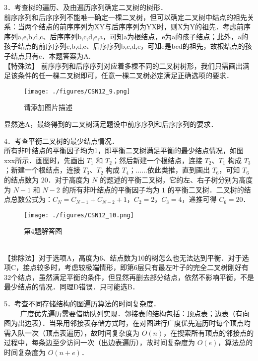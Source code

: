 3．考查树的遍历、及由遍历序列确定二叉树的树形．\\
前序序列和后序序列不能唯一确定一棵二叉树，但可以确定二叉树中结点的祖先关系：当两个结点的前序序列为XY与后序序列为YX时，则X为Y的祖先．考虑前序序列a,e,b,d,c、后序序列b,c,d,e,a，可知a为根结点，e为a的孩子结点；此外，a的孩子结点的前序序列e,b,d,c、后序序列b,c,d,e，可知e是bcd的祖先，故根结点的孩子结点只有e．本题答案为A. \\
【特殊法】 前序序列和后序序列对应着多棵不同的二叉树树形，我们只需画出满足该条件的任一棵二叉树即可，任意一棵二叉树必定满足正确选项的要求．
\begin{figure}[ht]
\centering
\texttt{[image: ./figures/CSN12\_9.png]}
\caption{请添加图片描述} \label{CSN12_fig9}
\end{figure}
显然选A，最终得到的二叉树满足题设中前序序列和后序序列的要求．

4．考查平衡二叉树的最少结点情况．\\
所有非叶结点的平衡因子均为1，即平衡二叉树满足平衡的最少结点情况，如图xxx所示．画图时，先画出 $T_1$ 和 $T_2$；然后新建一个根结点，连接 $T_2$、$T_1$ 构成 $T_3$；新建一个根结点，连接 $T_3$、$T_2$ 构成 $T_4$；......依此类推，直到画出 $T_6$，可知 $T_6$ 的结点数为 $20$．对于高度为 $N$ 的题述的平衡二叉树，它的左、右子树分别为高度为 $N-1$ 和 $N-2$ 的所有非叶结点的平衡因子均为 $1$ 的平衡二叉树．二叉树的结点总数公式为：$C_N=C_{N-1}+C_{N-2}+1$，$C_2=2$，$C_3=4$，递推可得 $C_6=20$．
\begin{figure}[ht]
\centering
\texttt{[image: ./figures/CSN12\_10.png]}
\caption{第4题解答图} \label{CSN12_fig10}
\end{figure} \\
【排除法】对于选项A，高度为6、结点数为10的树怎么也无法达到平衡．对于选项C，接点较多时，考虑较极端情形，即第6层只有最左叶子的完全二叉树刚好有32个结点，虽然满足平衡的条件，但显然再删去部分结点，依然不影响平衡，不是最少结点的情况．同理D错误．只可能选B．

5．考查不同存储结构的图遍历算法的时间复杂度．\\
$\qquad$ 广度优先遍历需要借助队列实现．邻接表的结构包括：顶点表；边表（有向图为出边表）．当采用邻接表存储方式时，在对图进行广度优先遍历时每个顶点均需入队一次（顶点表遍历），故时间复杂度为 $O(n)$，在搜索所有顶点的邻接点的过程中，每条边至少访问一次（出边表遍历），故时间复杂度为 $O(e)$，算法总的时间复杂度为 $O(n+e)$．

